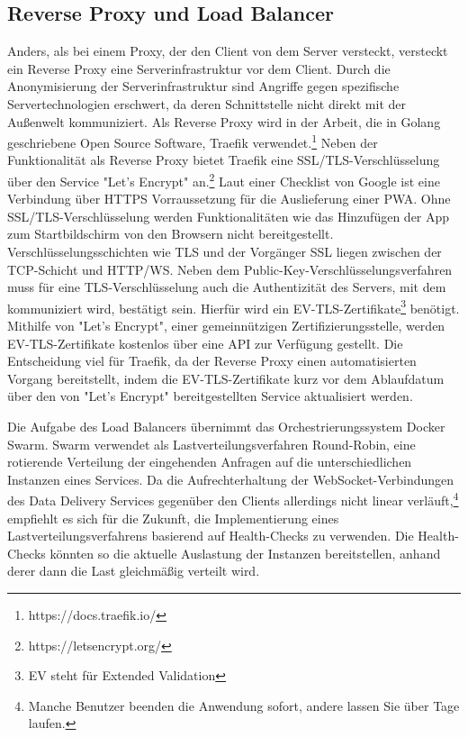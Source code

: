\subsection{Reverse Proxy und Load Balancer}
\label{subsec:reverseproxyundloadbalancer}
Anders, als bei einem Proxy, der den Client von dem Server versteckt, versteckt ein Reverse Proxy
eine Serverinfrastruktur vor dem Client. Durch die Anonymisierung der Serverinfrastruktur
sind Angriffe gegen spezifische Servertechnologien erschwert, da deren Schnittstelle
nicht direkt mit der Außenwelt kommuniziert. Als Reverse Proxy wird in der Arbeit,
die in Golang geschriebene Open Source Software, Traefik verwendet.\footnote{https://docs.traefik.io/}
Neben der Funktionalität als Reverse Proxy bietet Traefik eine
SSL/TLS-Verschlüsselung über den Service "Let's Encrypt" an.\footnote{https://letsencrypt.org/}
Laut einer Checklist von Google ist eine Verbindung über HTTPS
Vorraussetzung für die Auslieferung einer PWA.\cite{GooglePWAChecklist}
Ohne SSL/TLS-Verschlüsselung werden Funktionalitäten wie das Hinzufügen der App zum Startbildschirm
von den Browsern nicht bereitgestellt. Verschlüsselungsschichten wie TLS und der Vorgänger
SSL liegen zwischen der TCP-Schicht und HTTP/WS. Neben dem Public-Key-Verschlüsselungsverfahren
muss für eine TLS-Verschlüsselung auch die Authentizität des Servers, mit dem kommuniziert wird,
bestätigt sein. Hierfür wird ein EV-TLS-Zertifikate\footnote{EV steht für Extended Validation} benötigt.
Mithilfe von "Let's Encrypt", einer gemeinnützigen Zertifizierungsstelle, werden EV-TLS-Zertifikate
kostenlos über eine API zur Verfügung gestellt. Die Entscheidung viel für Traefik,
da der Reverse Proxy einen automatisierten Vorgang bereitstellt, indem die EV-TLS-Zertifikate
kurz vor dem Ablaufdatum über den von "Let's Encrypt" bereitgestellten Service aktualisiert werden.

Die Aufgabe des Load Balancers übernimmt das Orchestrierungssystem Docker Swarm. Swarm verwendet
als Lastverteilungsverfahren Round-Robin, eine rotierende Verteilung der eingehenden Anfragen auf
die unterschiedlichen Instanzen eines Services.\cite{CloudflareRoundRobinDNS}
Da die Aufrechterhaltung der WebSocket-Verbindungen des Data Delivery Services gegenüber
den Clients allerdings nicht linear verläuft,\footnote{Manche Benutzer beenden die Anwendung sofort, andere lassen Sie über Tage laufen.}
empfiehlt es sich für die Zukunft, die Implementierung eines Lastverteilungsverfahrens
basierend auf Health-Checks zu verwenden. Die Health-Checks könnten so die aktuelle
Auslastung der Instanzen bereitstellen, anhand derer dann die Last gleichmäßig verteilt wird.

